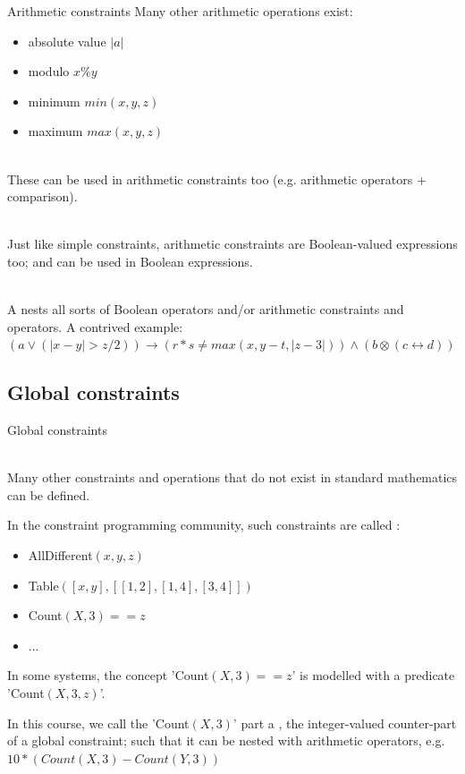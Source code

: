 \documentclass{cons-beamer}
\begin{document}
\begin{frame}{Arithmetic constraints}
  Many other arithmetic operations exist:

  \begin{itemize}
    \item absolute value $|a|$
    \item modulo $x \% y$
    \item minimum $min(x,y,z)$
    \item maximum $max(x,y,z)$
  \end{itemize}

  $ $\\
  These can be used in arithmetic constraints too (e.g. arithmetic operators + comparison).

  $ $\\
  Just like simple constraints, arithmetic constraints are Boolean-valued expressions too; and can be used in Boolean expressions.

  $ $\\
  A  nests all sorts of Boolean operators and/or arithmetic constraints and operators. A contrived example: $(a \vee (|x - y| > z/2)) \rightarrow (r * s \neq  max(x, y-t, |z-3|)) \wedge (b \otimes (c \leftrightarrow  d))$

\end{frame}


\subsection{Global constraints}

\begin{frame}{Global constraints}

  $ $\\
  Many other constraints and operations that do not exist in standard mathematics can be defined.

  In the constraint programming community, such constraints are called :

  \begin{itemize}
    \item AllDifferent$(x, y, z)$
    \item Table$([x,y], [[1,2],[1,4],[3,4]])$
    \item Count$(X, 3) == z$
    \item ...
  \end{itemize}

  In some systems, the concept 'Count$(X, 3) == z$' is modelled with a predicate 'Count$(X, 3, z)$'.

  In this course, we call the 'Count$(X, 3)$' part a , the integer-valued counter-part of a global constraint; such that it can be nested with arithmetic operators, e.g. $10*(Count(X, 3) - Count(Y, 3))$
\end{frame}
\end{document}

